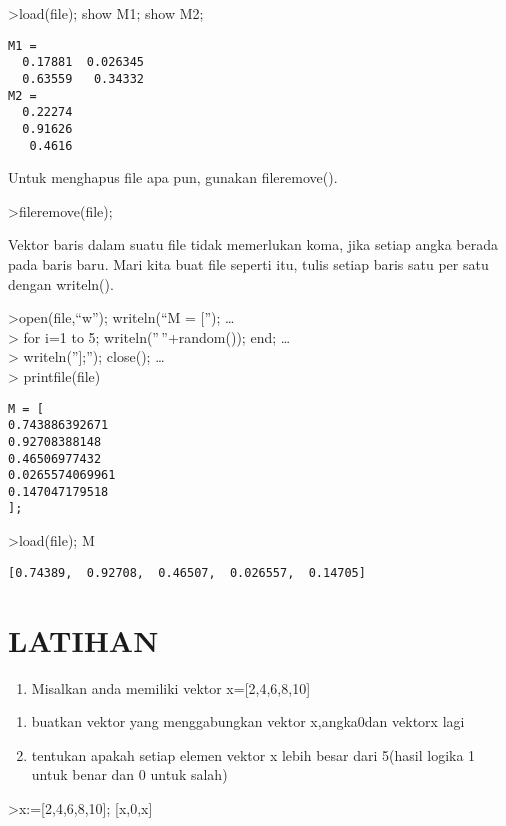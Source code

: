 \documentclass[
]{book}
\providecommand{\tightlist}{%
  \setlength{\itemsep}{0pt}\setlength{\parskip}{0pt}}
\begin{document}
\textgreater load(file); show M1; show M2;

\begin{verbatim}
M1 = 
  0.17881  0.026345 
  0.63559   0.34332 
M2 = 
  0.22274 
  0.91626 
   0.4616 
\end{verbatim}

Untuk menghapus file apa pun, gunakan fileremove().

\textgreater fileremove(file);

Vektor baris dalam suatu file tidak memerlukan koma, jika setiap angka berada pada baris baru. Mari kita buat file seperti itu, tulis setiap baris satu per satu dengan writeln().

\textgreater open(file,``w''); writeln(``M = {[}''); \ldots{}\\
\textgreater{} for i=1 to 5; writeln(''\,''+random()); end; \ldots{}\\
\textgreater{} writeln(''{]};''); close(); \ldots{}\\
\textgreater{} printfile(file)

\begin{verbatim}
M = [
0.743886392671
0.92708388148
0.46506977432
0.0265574069961
0.147047179518
];
\end{verbatim}

\textgreater load(file); M

\begin{verbatim}
[0.74389,  0.92708,  0.46507,  0.026557,  0.14705]
\end{verbatim}

\section{LATIHAN}\label{latihan}

\begin{enumerate}
\def\labelenumi{\arabic{enumi}.}
\tightlist
\item
  Misalkan anda memiliki vektor x={[}2,4,6,8,10{]}
\end{enumerate}

\begin{enumerate}
\def\labelenumi{\alph{enumi}.}
\item
  buatkan vektor yang menggabungkan vektor x,angka0dan vektorx lagi
\item
  tentukan apakah setiap elemen vektor x lebih besar dari 5(hasil logika 1 untuk benar dan 0 untuk salah)
\end{enumerate}

\textgreater x:={[}2,4,6,8,10{]}; {[}x,0,x{]}
\end{document}
